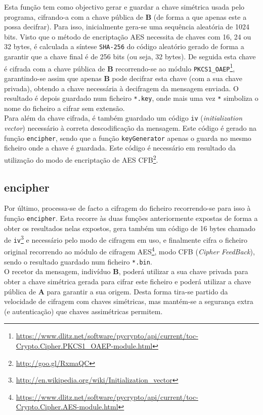 \documentclass[a4paper,11pt,openright,oneside]{report}
\begin{document}
Esta função tem como objectivo gerar e guardar a chave simétrica usada pelo programa, cifrando-a com a chave pública de \textbf{B} (de forma a que apenas este a possa decifrar). Para isso, inicialmente gera-se uma sequência aleatória de 1024 bits. Visto que o método de encriptação AES necessita de chaves com 16, 24 ou 32 bytes, é calculada a síntese \verb|SHA-256| do código aleatório gerado de forma a garantir que a chave final é de 256 bits (ou seja, 32 bytes). De seguida esta chave é cifrada com a chave pública de \textbf{B} recorrendo-se ao módulo \verb|PKCS1_OAEP|\footnote{\url{https://www.dlitz.net/software/pycrypto/api/current/toc-Crypto.Cipher.PKCS1_OAEP-module.html}}, garantindo-se assim que apenas \textbf{B} pode decifrar esta chave (com a sua chave privada), obtendo a chave necessária à decifragem da mensagem enviada. O resultado é depois guardado num ficheiro \verb|*.key|, onde mais uma vez \verb|*| simboliza o nome do ficheiro a cifrar sem extensão.\\

Para além da chave cifrada, é também guardado um código \verb|iv| (\textit{initialization vector}) necessário à correta descodificação da mensagem. Este código é gerado na função \verb|encipher|, sendo que a função \verb|keyGenerator| apenas o guarda no mesmo ficheiro onde a chave é guardada. Este código é necessário em resultado da utilização do modo de encriptação de AES CFB\footnote{\url{http://goo.gl/RxmaQC}}.

\subsection{encipher}

Por último, processa-se de facto a cifragem do ficheiro recorrendo-se para isso à função \verb|encipher|. Esta recorre às duas funções anteriormente expostas de forma a obter os resultados nelas expostos, gera também um código de 16 bytes chamado de \verb|iv|\footnote{\url{http://en.wikipedia.org/wiki/Initialization_vector}} e necessário pelo modo de cifragem em uso, e finalmente cifra o ficheiro original recorrendo ao módulo de cifragem AES\footnote{\url{https://www.dlitz.net/software/pycrypto/api/current/toc-Crypto.Cipher.AES-module.html}}, modo CFB (\textit{Cipher FeedBack}), sendo o resultado guardado num ficheiro \verb|*.bin|.\\

O recetor da mensagem, indivíduo \textbf{B}, poderá utilizar a sua chave privada para obter a chave simétrica gerada para cifrar este ficheiro e poderá utilizar a chave pública de \textbf{A} para garantir a sua origem. Desta forma tira-se partido da velocidade de cifragem com chaves simétricas, mas mantém-se a segurança extra (e autenticação) que chaves assimétricas permitem.
\end{document}
